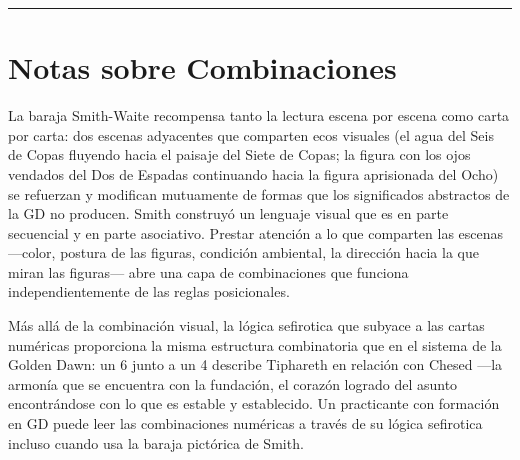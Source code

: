 \begin{center}\rule{0.5\linewidth}{0.5pt}\end{center}

\section{Notas sobre Combinaciones}\label{notes-on-combinations}

La baraja Smith-Waite recompensa tanto la lectura escena por escena como carta por carta: dos escenas adyacentes que comparten ecos visuales (el agua del Seis de Copas fluyendo hacia el paisaje del Siete de Copas; la figura con los ojos vendados del Dos de Espadas continuando hacia la figura aprisionada del Ocho) se refuerzan y modifican mutuamente de formas que los significados abstractos de la GD no producen. Smith construyó un lenguaje visual que es en parte secuencial y en parte asociativo. Prestar atención a lo que comparten las escenas ---color, postura de las figuras, condición ambiental, la dirección hacia la que miran las figuras--- abre una capa de combinaciones que funciona independientemente de las reglas posicionales.

Más allá de la combinación visual, la lógica sefirotica que subyace a las cartas numéricas proporciona la misma estructura combinatoria que en el sistema de la Golden Dawn: un 6 junto a un 4 describe Tiphareth en relación con Chesed ---la armonía que se encuentra con la fundación, el corazón logrado del asunto encontrándose con lo que es estable y establecido. Un practicante con formación en GD puede leer las combinaciones numéricas a través de su lógica sefirotica incluso cuando usa la baraja pictórica de Smith.
